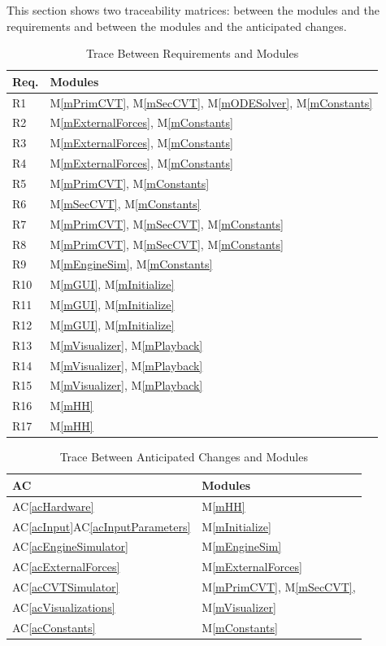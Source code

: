 \documentclass[12pt, titlepage]{article}
\newcommand{\acref}[1]{AC\ref{#1}}
\newcommand{\mref}[1]{M\ref{#1}}
\begin{document}
This section shows two traceability matrices: between the modules and the
requirements and between the modules and the anticipated changes.

\begin{table}[H]
\centering
\begin{tabular}{p{} p{}}
\toprule
\textbf{Req.} & \textbf{Modules}\\
\midrule
R1 & \mref{mPrimCVT}, \mref{mSecCVT}, \mref{mODESolver}, \mref{mConstants}\\
R2 & \mref{mExternalForces}, \mref{mConstants}\\
R3 & \mref{mExternalForces}, \mref{mConstants}\\
R4 & \mref{mExternalForces}, \mref{mConstants}\\
R5 & \mref{mPrimCVT}, \mref{mConstants}\\
R6 & \mref{mSecCVT}, \mref{mConstants}\\
R7 & \mref{mPrimCVT}, \mref{mSecCVT}, \mref{mConstants}\\
R8 & \mref{mPrimCVT}, \mref{mSecCVT}, \mref{mConstants}\\
R9 & \mref{mEngineSim}, \mref{mConstants}\\
R10 & \mref{mGUI}, \mref{mInitialize}\\
R11 & \mref{mGUI}, \mref{mInitialize}\\
R12 & \mref{mGUI}, \mref{mInitialize}\\
R13 & \mref{mVisualizer}, \mref{mPlayback}\\
R14 & \mref{mVisualizer}, \mref{mPlayback}\\
R15 & \mref{mVisualizer}, \mref{mPlayback}\\
R16 & \mref{mHH}\\
R17 & \mref{mHH}\\
\bottomrule
\end{tabular}
\caption{Trace Between Requirements and Modules}
\label{TblRT}
\end{table}

\begin{table}[H]
\centering
\begin{tabular}{p{} p{}}
\toprule
\textbf{AC} & \textbf{Modules}\\
\midrule
\acref{acHardware} & \mref{mHH}\\
\acref{acInput}\acref{acInputParameters} & \mref{mInitialize}\\
\acref{acEngineSimulator} & \mref{mEngineSim}\\
\acref{acExternalForces} & \mref{mExternalForces}\\
\acref{acCVTSimulator} & \mref{mPrimCVT}, \mref{mSecCVT},\\
\acref{acVisualizations} & \mref{mVisualizer}\\
\acref{acConstants} & \mref{mConstants}\\

\bottomrule
\end{tabular}
\caption{Trace Between Anticipated Changes and Modules}
\label{TblACT}
\end{table}
\end{document}
